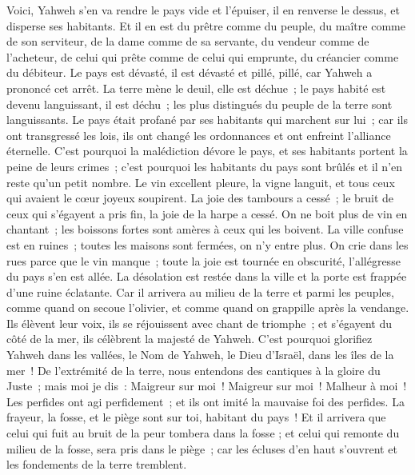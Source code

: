 \begin{multicols}{2}
\VerseOne{}Voici, Yahweh s'en va rendre le pays vide et l'épuiser, il en renverse le dessus, et disperse ses habitants.
Et il en est du prêtre comme du peuple, du maître comme de son serviteur, de la dame comme de sa servante, du vendeur comme de l'acheteur, de celui qui prête comme de celui qui emprunte, du créancier comme du débiteur.
Le pays est dévasté, il est dévasté et pillé, pillé, car Yahweh a prononcé cet arrêt.
La terre mène le deuil, elle est déchue~; le pays habité est devenu languissant, il est déchu~; les plus distingués du peuple de la terre sont languissants.
Le pays était profané par ses habitants qui marchent sur lui~; car ils ont transgressé les lois, ils ont changé les ordonnances et ont enfreint l'alliance éternelle.
C'est pourquoi la malédiction dévore le pays, et ses habitants portent la peine de leurs crimes~; c'est pourquoi les habitants du pays sont brûlés et il n'en reste qu'un petit nombre.
Le vin excellent pleure, la vigne languit, et tous ceux qui avaient le cœur joyeux soupirent.
La joie des tambours a cessé~; le bruit de ceux qui s'égayent a pris fin, la joie de la harpe a cessé.
On ne boit plus de vin en chantant~; les boissons fortes sont amères à ceux qui les boivent.
La ville confuse est en ruines~; toutes les maisons sont fermées, on n'y entre plus.
On crie dans les rues parce que le vin manque~; toute la joie est tournée en obscurité, l'allégresse du pays s'en est allée.
La désolation est restée dans la ville et la porte est frappée d'une ruine éclatante.
Car il arrivera au milieu de la terre et parmi les peuples, comme quand on secoue l'olivier, et comme quand on grappille après la vendange.
Ils élèvent leur voix, ils se réjouissent avec chant de triomphe~; et s'égayent du côté de la mer, ils célèbrent la majesté de Yahweh.
C'est pourquoi glorifiez Yahweh dans les vallées, le Nom de Yahweh, le Dieu d'Israël, dans les îles de la mer~!
De l'extrémité de la terre, nous entendons des cantiques à la gloire du Juste~; mais moi je dis~: Maigreur sur moi~! Maigreur sur moi~! Malheur à moi~! Les perfides ont agi perfidement~; et ils ont imité la mauvaise foi des perfides.
La frayeur, la fosse, et le piège sont sur toi, habitant du pays~!
Et il arrivera que celui qui fuit au bruit de la peur tombera dans la fosse ; et celui qui remonte du milieu de la fosse, sera pris dans le piège~; car les écluses d'en haut s'ouvrent et les fondements de la terre tremblent.

\end{multicols}
